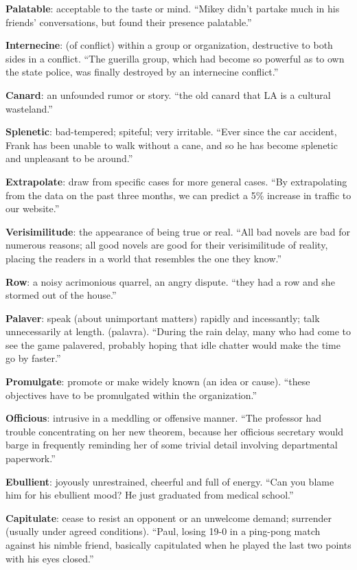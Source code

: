 \documentclass[12pt, a4paper]{ximera}
\begin{document}
\textbf{Palatable}: acceptable to the taste or mind. ``Mikey didn't partake much in his friends' conversations, but found their presence palatable.''

\textbf{Internecine}: (of conflict) within a group or organization, destructive to both sides in a conflict. ``The guerilla group, which had become so powerful as to own the state police, was finally destroyed by an internecine conflict.''

\textbf{Canard}: an unfounded rumor or story. ``the old canard that LA is a cultural wasteland.''

\textbf{Splenetic}: bad-tempered; spiteful; very irritable. ``Ever since the car accident, Frank has been unable to walk without a cane, and so he has become splenetic and unpleasant to be around.''

\textbf{Extrapolate}: draw from specific cases for more general cases. ``By extrapolating from the data on the past three months, we can predict a 5\% increase in traffic to our website.''

\textbf{Verisimilitude}: the appearance of being true or real. ``All bad novels are bad for numerous reasons; all good novels are good for their verisimilitude of reality, placing the readers in a world that resembles the one they know.''

\textbf{Row}: a noisy acrimonious quarrel, an angry dispute. ``they had a row and she stormed out of the house.''

\textbf{Palaver}: speak (about unimportant matters) rapidly and incessantly; talk unnecessarily at length. (palavra). ``During the rain delay, many who had come to see the game palavered, probably hoping that idle chatter would make the time go by faster.''

\textbf{Promulgate}: promote or make widely known (an idea or cause). ``these objectives have to be promulgated within the organization.''

\textbf{Officious}: intrusive in a meddling or offensive manner. ``The professor had trouble concentrating on her new theorem, because her officious secretary would barge in frequently reminding her of some trivial detail involving departmental paperwork.''

\textbf{Ebullient}: joyously unrestrained, cheerful and full of energy. ``Can you blame him for his ebullient mood? He just graduated from medical school.''

\textbf{Capitulate}: cease to resist an opponent or an unwelcome demand; surrender (usually under agreed conditions). ``Paul, losing 19-0 in a ping-pong match against his nimble friend, basically capitulated when he played the last two points with his eyes closed.''
\end{document}
